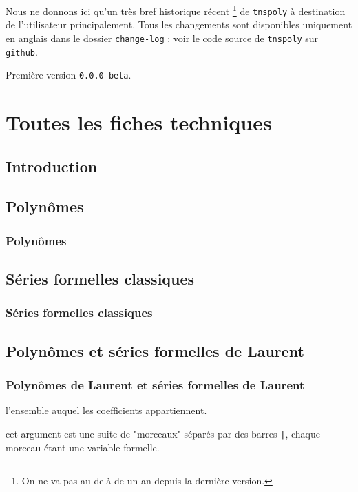 \documentclass[12pt,a4paper]{article}
\theoremstyle{definition}
\begin{document}
Nous ne donnons ici qu'un très bref historique récent
\footnote{
	On ne va pas au-delà de un an depuis la dernière version.
}
de \verb+tnspoly+ à destination de l'utilisateur principalement.
Tous les changements sont disponibles uniquement en anglais dans le dossier \verb+change-log+ : voir le code source de \verb+tnspoly+ sur \verb+github+.

\begin{description}

    \medskip
    \item[2020-07-10] Première version \verb+0.0.0-beta+.

\end{description}


\newpage
\section{Toutes les fiches techniques} \label{techincal-ids}

\subsection{Introduction}
\subsection{Polynômes}

\subsubsection{Polynômes}


\subsection{Séries formelles classiques}

\subsubsection{Séries formelles classiques}


\subsection{Polynômes et séries formelles de Laurent}

\subsubsection{Polynômes de Laurent et séries formelles de Laurent}



 l'ensemble auquel les coefficients appartiennent.

 cet argument est une suite de "morceaux" séparés par des barres \verb+|+, chaque morceau étant une variable formelle.
\newpage
\end{document}
